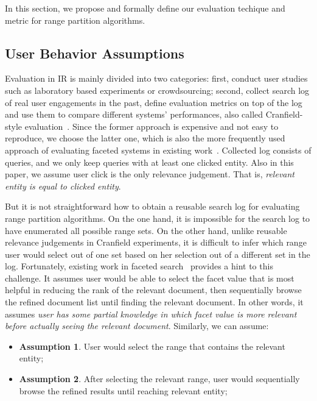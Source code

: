In this section, we propose and formally define our evaluation techique and metric for range partition algorithms. 

\subsection{User Behavior Assumptions}
\label{sec:reusing}

Evaluation in IR is mainly divided into two categories: first, conduct user studies such as laboratory based experiments or crowdsourcing; second, collect search log of real user engagements in the past, define evaluation metrics on top of the log and use them to compare different systems' performances, also called Cranfield-style evaluation~\cite{SparckJones:1997:RIR:275537}. Since the former approach is expensive and not easy to reproduce, we choose the latter one, which is also the more frequently used approach of evaluating faceted systems in existing work~\cite{Liberman:2012:AOF:2245276.2245409,Vandic:2013:FSA:2505515.2505664}. Collected log consists of queries, and we only keep queries with at least one clicked entity. Also in this paper, we assume user click is the only relevance judgement. That is, \emph{relevant entity is equal to clicked entity}. 

But it is not straightforward how to obtain a reusable search log for evaluating range partition algorithms. On the one hand, it is impossible for the search log to have enumerated all possible range sets. On the other hand, unlike reusable relevance judgements in Cranfield experiments, it is difficult to infer which range user would select out of one set based on her selection out of a different set in the log. Fortunately, existing work in faceted search~\cite{Liberman:2012:AOF:2245276.2245409} provides a hint to this challenge. It assumes user would be able to select the facet value that is most helpful in reducing the rank of the relevant document, then sequentially browse the refined document list until finding the relevant document. In other words, it assumes \emph{user has some partial knowledge in which facet value is more relevant before actually seeing the relevant document}. Similarly, we can assume:

\begin{itemize}
\vspace{-0.02in}
\setlength\itemsep{0em}
\item \textbf{Assumption 1}. User would select the range that contains the relevant entity;
\item \textbf{Assumption 2}. After selecting the relevant range, user would sequentially browse the refined results until reaching relevant entity;
\vspace{-0.02in}
\end{itemize}

